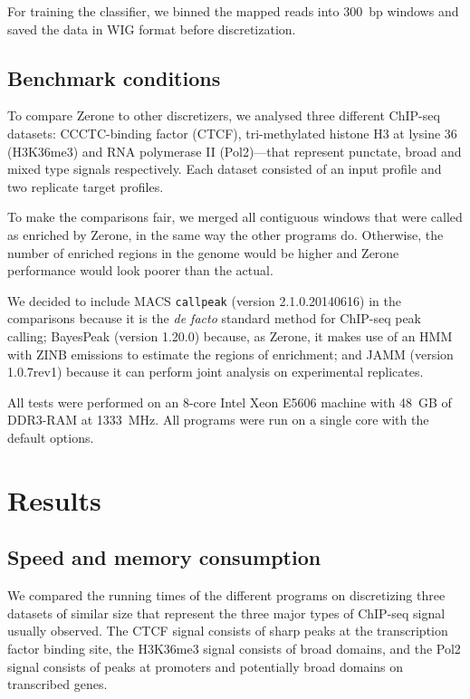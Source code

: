 \documentclass{bioinfo}
\begin{document}
\begin{methods}
For training the classifier, we binned the mapped reads into 300~bp
windows and saved the data in WIG format before discretization.

\subsection{Benchmark conditions}
To compare Zerone to other discretizers, we analysed three different
ChIP-seq datasets: CCCTC-binding factor (CTCF), tri-methylated histone H3 at
lysine 36 (H3K36me3) and RNA polymerase II (Pol2)---that represent punctate,
broad and mixed type signals respectively. Each dataset consisted of an input
profile and two replicate target profiles.

To make the comparisons fair, we merged all contiguous windows that were called
as enriched by Zerone, in the same way the other programs do. Otherwise, the
number of enriched regions in the genome would be higher and Zerone performance
would look poorer than the actual.

We decided to include MACS \texttt{callpeak} (version 2.1.0.20140616) in
the comparisons because it is the \textit{de facto} standard method
for ChIP-seq peak calling; BayesPeak (version 1.20.0) because, as Zerone,
it makes use of an HMM with ZINB emissions to estimate the regions of
enrichment; and JAMM (version 1.0.7rev1) because it can perform joint
analysis on experimental replicates.

All tests were performed on an 8-core Intel Xeon E5606 machine with 48~GB of
DDR3-RAM at 1333~MHz. All programs were run on a single core with the default
options.

\end{methods}

\section{Results}
\label{sec:results}

\subsection{Speed and memory consumption}
We compared the running times of the different programs on discretizing
three datasets of similar size that represent the three major types of
ChIP-seq signal usually observed. The CTCF signal consists of sharp
peaks at the transcription factor binding site, the H3K36me3 signal 
consists of broad domains, and the Pol2 signal consists of  peaks
at promoters and potentially broad domains on transcribed genes.
\end{document}

